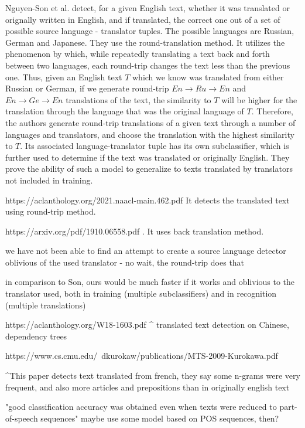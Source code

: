 \documentclass[twocolumn]{article}
\begin{document}
Nguyen-Son et al. \cite{roundtrip} detect, for a given English text, whether it was translated or orignally written in English, and if translated, the correct one out of a set of possible source language - translator tuples. The possible languages are Russian, German and Japanese. They use the round-translation method. It utilizes the phenomenon by which, while repeatedly translating a text back and forth between two languages, each round-trip changes the text less than the previous one. Thus, given an English text $T$ which we know was translated from either Russian or German, if we generate round-trip $En \rightarrow Ru \rightarrow En$ and $En \rightarrow Ge \rightarrow En$ translations of the text, the similarity to $T$ will be higher for the translation through the language that was the original language of $T$. Therefore, the authors generate round-trip translations of a given text through a number of languages and translators, and choose the translation with the highest similarity to $T$. Its associated language-translator tuple has its own subclassifier, which is further used to determine if the text was translated or originally English. They prove the ability of such a model to generalize to texts translated by translators not included in training.

https://aclanthology.org/2021.naacl-main.462.pdf 
 It detects the translated text using round-trip method. 


https://arxiv.org/pdf/1910.06558.pdf
. It uses back translation method. 

we have not been able to find an attempt to create a source language detector oblivious of the used translator - no wait, the round-trip does that

in comparison to Son, ours would be much faster if it works
and oblivious to the translator used, both in training (multiple subclassifiers) and in recognition (multiple translations)

https://aclanthology.org/W18-1603.pdf
^ translated text detection on Chinese, dependency trees


https://www.cs.cmu.edu/~dkurokaw/publications/MTS-2009-Kurokawa.pdf

^This paper detects text translated from french, they say some n-grams were very frequent, and also more articles and prepositions than in originally english text

"good classification accuracy was obtained even when texts were reduced to part-of-speech sequences"  maybe use some model based on POS sequences, then?
\end{document}
